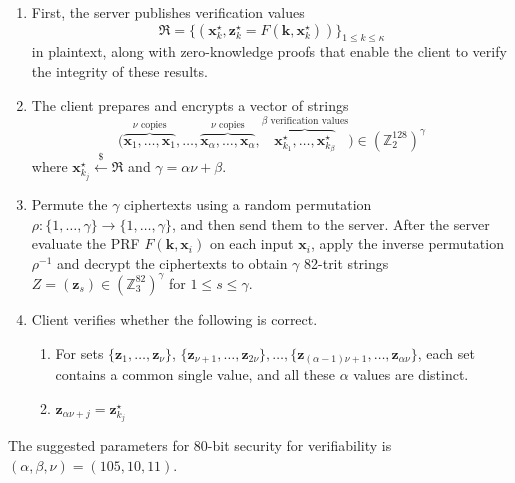 \documentclass[runningheads]{llncs}
\newcommand{\bb}[1]{\mathbb{#1}}  %
\begin{document}
            \begin{enumerate}
                \item First, the server publishes verification values 
                    \[
                        \mathfrak R=\{(\mathbf{x}^\star_k,\mathbf{z}^\star_k=F(\mathbf{k},\mathbf{x}^\star_k))\}_{1\leq k \leq \kappa}
                    \]
                in plaintext, along with zero-knowledge proofs that enable the client to verify the integrity of these results.
                
                \item The client prepares and encrypts a vector of strings 
                    \[
                        \Big(\overbrace{\mathbf{x}_1,\dots,\mathbf{x}_1}^{\nu \text{ copies} },\dots,\overbrace{\mathbf{x}_\alpha,\dots,\mathbf{x}_\alpha}^{\nu \text{ copies}},\overbrace{\mathbf{x}^\star_{k_1},\dots, \mathbf{x}^\star_{k_\beta}}^{\beta \text{ verification values}}\Big)\in(\bb Z_2^{128})^\gamma
                    \]
                where $\mathbf{x}^\star_{k_j}\overset{\$}{\gets} \mathfrak R$ and $\gamma=\alpha\nu+\beta$.
                
                \item Permute the \(\gamma\) ciphertexts using a random permutation \(\rho: \{1,\dots,\gamma\} \to \{1,\dots,\gamma\}\), and then send them to the server. After the server evaluate the PRF $F(\mathbf{k},\mathbf{x}_i)$ on each input $\mathbf{x}_i$, apply the inverse permutation \(\rho^{-1}\) and decrypt the ciphertexts to obtain \(\gamma\) 82-trit strings 
                \(Z=(\mathbf{z}_s) \in \left(\mathbb{Z}_3^{82}\right)^\gamma \) for \(1\leq s\leq \gamma.\)

                \item Client verifies whether the following is correct.
                    \begin{enumerate}      
                        \item For sets $\{\mathbf{z}_1,\dots,\mathbf{z}_\nu\}$, $\{\mathbf{z}_{\nu+1},\dots,\mathbf{z}_{2\nu}\},\dots, \{\mathbf{z}_{(\alpha-1)\nu+1},\dots, \mathbf{z}_{\alpha\nu}\}$, each set contains a common single value, and all these $\alpha$ values are distinct.
                        \item $\mathbf{z}_{\alpha\nu+j}=\mathbf{z}^\star_{k_j}$
                    \end{enumerate}
            \end{enumerate}
        The suggested parameters for 80-bit security for verifiability is $(\alpha,\beta,\nu)=(105,10,11)$.
\end{document}
